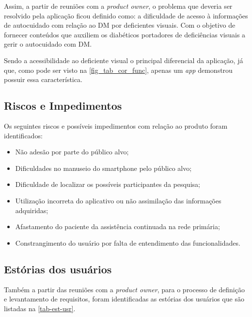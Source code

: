 Assim, a partir de reuniões com a \emph{product owner}, o problema que deveria ser resolvido pela aplicação ficou
definido como: a dificuldade de acesso à informações de autocuidado com relação ao DM por deficientes visuais.
Com o objetivo de fornecer conteúdos que auxiliem os diabéticos portadores de deficiências visuais a gerir o autocuidado com DM\@.

Sendo a acessibilidade ao deficiente visual o principal diferencial da aplicação, já que, como pode ser visto na \autoref{fig_tab_cor_func},
apenas um \emph{app} demonstrou possuir essa característica.

\subsection{Riscos e Impedimentos}

Os seguintes riscos e possíveis impedimentos com relação ao produto foram identificados:

\begin{itemize}
    \item Não adesão por parte do público alvo;
    \item Dificuldades no manuseio do smartphone pelo público alvo;
    \item Dificuldade de localizar os possíveis participantes da pesquisa;
    \item Utilização incorreta do aplicativo ou não assimilação das informações adquiridas;
    \item Afastamento do paciente da assistência continuada na rede primária;
    \item Constrangimento do usuário por falta de entendimento das funcionalidades.
\end{itemize}

\newpage

\subsection{Estórias dos usuários}

Também a partir das reuniões com a \emph{product owner}, para o processo de definição e levantamento de requisitos, foram identificadas
as estórias dos usuários que são listadas na \autoref{tab-est-usr}.

